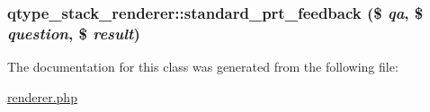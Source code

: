 \hypertarget{classqtype__stack__renderer_ad70697193990cc2e7282c260d8c3f375}{
\subsubsection[{standard\_\-prt\_\-feedback}]{\setlength{\rightskip}{0pt plus 5cm}qtype\_\-stack\_\-renderer::standard\_\-prt\_\-feedback (\$ {\em qa}, \/  \$ {\em question}, \/  \$ {\em result})}}
\label{classqtype__stack__renderer_ad70697193990cc2e7282c260d8c3f375}


The documentation for this class was generated from the following file:\begin{DoxyCompactItemize}
\item 
\hyperlink{renderer_8php}{renderer.php}\end{DoxyCompactItemize}
